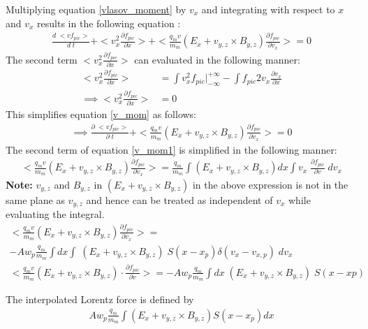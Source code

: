 \documentclass{article}
\begin{document}
Multiplying equation \ref{vlasov_moment} by $v_{x}$ and integrating with respect to $x$ and $v_{x}$ results in the following equation :
\begin{align}
\frac{d\;<vf_{pic}>}{d\;t} + <v_{x}^{2}\frac{\partial f_{pic}}{\partial x}> + <\frac{q_{m}v}{m_{m}}(E_{x} + v_{y,z} \times B_{y,z}) \frac{\partial f_{pic}}{\partial v_{x}}> = 0 \label{v_mom}
\end{align}
The second term $<v_{x}^{2}\frac{\partial f_{pic}}{\partial x}>$ can evaluated in the following manner:
\begin{align}
<v_{x}^{2}\frac{\partial f_{pic}}{\partial x}> &= \int v_{x}^{2}f_{pic}\rvert_{-\infty}^{+\infty} - \int f_{pic}2v_{x}\frac{\partial v_{x}}{\partial x} \\
\implies <v_{x}^{2}\frac{\partial f_{pic}}{\partial x}> &= 0
\end{align}
This simplifies equation \ref{v_mom} as follows:
\begin{align}
\implies \frac{\partial\;<vf_{pic}>}{\partial\;t} + <\frac{q_{m}v}{m_{m}}(E_{x} + v_{y,z} \times B_{y,z}) \frac{\partial f_{pic}}{\partial v_{x}}> = 0  \label{v_mom1}
\end{align}
The second term of equation \ref{v_mom1} is simplified in the following manner:
\begin{multline}
<\frac{q_{m}v}{m_{m}}(E_{x} + v_{y,z} \times B_{y,z})\frac{\partial f_{pic}}{\partial v_{x}}> = \frac{q_{m}}{m_{m}}\int (E_{x} + v_{y,z} \times B_{y,z}) dx \int v_{x}\;\frac{\partial f_{pic}}{\partial v}\;dv_{x}
\end{multline}
\textbf{Note:} $v_{y,z}$ and $B_{y,z}$ in $(E_{x}+v_{y,z}\times B_{y,z})$ in the above expression is not in the same plane as $v_{y,z}$ and hence can be treated as independent of $v_{x}$ while evaluating the integral.
\begin{multline}
<\frac{q_{m}v}{m_{m}}(E_{x} + v_{y,z} \times B_{y,z})\frac{\partial f_{pic}}{\partial v_{x}}> = \\
-Aw_{p}\frac{q_{m}}{m_{m}}\int  dx \int \;(E_{x} + v_{y,z} \times B_{y,z})\;S(x-x_{p})\delta(v_{x}-v_{x,p})\;dv_{x} \\
<\frac{q_{m}v}{m_{m}}(E_{x} + v_{y,z} \times B_{y,z})\cdot \frac{\partial f_{pic}}{\partial v}> = -Aw_{p}\frac{q_{m}}{m_{m}}\int  dx\;(E_{x} + v_{y,z} \times B_{y,z})\;S(x-x{p})
\end{multline}

The interpolated Lorentz force is defined by
\begin{align}
Aw_{p}\frac{q_{m}}{m_{m}}\int (E_{x}+ v_{y,z}\times B_{y,z})S(x - x_{p})dx
\end{align}
\end{document}
